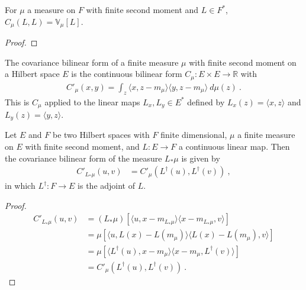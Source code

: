 \begin{lemma}\label{lem:covarianceBilin_same_eq_variance}
  \mathlibok
For $\mu$ a measure on $F$ with finite second moment and $L \in F^*$, $C_\mu(L, L) = \mathbb{V}_\mu[L]$.
\end{lemma}

\begin{proof}\leanok

\end{proof}


\begin{definition}\label{def:covInnerBilin}
  \leanok
The covariance bilinear form of a finite measure $\mu$ with finite second moment on a Hilbert space $E$ is the continuous bilinear form $C_\mu : E \times E \to \mathbb{R}$ with
\begin{align*}
  C'_\mu(x, y) = \int_z \langle x, z - m_\mu \rangle \langle y, z - m_\mu \rangle \: d\mu(z) \: .
\end{align*}
This is $C_\mu$ applied to the linear maps $L_x, L_y \in E^*$ defined by $L_x(z) = \langle x, z \rangle$ and $L_y(z) = \langle y, z \rangle$.
\end{definition}


\begin{lemma}\label{lem:covInnerBilin_map}
  \leanok
Let $E$ and $F$ be two Hilbert spaces with $F$ finite dimensional, $\mu$ a finite measure on $E$ with finite second moment, and $L : E \to F$ a continuous linear map.
Then the covariance bilinear form of the measure $L_*\mu$ is given by
\begin{align*}
  C'_{L_*\mu}(u, v)
  &= C'_\mu(L^\dagger(u), L^\dagger(v))
  \: ,
\end{align*}
in which $L^\dagger : F \to E$ is the adjoint of $L$.
\end{lemma}

\begin{proof}\leanok
\begin{align*}
  C'_{L_*\mu}(u, v)
  &= (L_*\mu)\left[\langle u, x - m_{L_*\mu}\rangle \langle x - m_{L_*\mu}, v \rangle\right]
  \\
  &= \mu\left[\langle u, L(x) - L(m_\mu)\rangle \langle L(x) - L(m_\mu), v \rangle \right]
  \\
  &= \mu\left[\langle L^\dagger(u), x - m_\mu\rangle \langle x - m_\mu, L^\dagger(v) \rangle \right]
  \\
  &= C'_\mu(L^\dagger(u), L^\dagger(v))
  \: .
\end{align*}
\end{proof}


